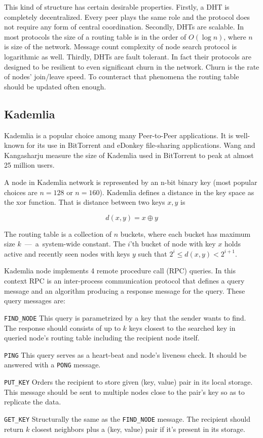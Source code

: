   This kind of structure has certain desirable properties. Firstly, a DHT is
  completely decentralized. Every peer plays the same role and the protocol does
  not require any form of central coordination.
  Secondly, DHTs are scalable.
  In most protocols the size of a routing table is in the order of $O(\log n)$,
  where $n$ is size of the network. Message count complexity of node search
  protocol is logarithmic as well. Thirdly, DHTs are fault tolerant. In fact
  their protocols are designed to be resilient to even significant churn in the
  network. Churn is the rate of nodes' join/leave speed. To counteract that
  phenomena the routing table should be updated often enough.
 
  \subsection{Kademlia}
  Kademlia \cite{may02} is a popular choice among many Peer-to-Peer
  applications. It is well-known for its use in BitTorrent and eDonkey
  file-sharing applications. Wang and Kangasharju \cite{wan13} measure the size
  of Kademlia used in BitTorrent to peak at almost 25 million users.

  A node in Kademlia network is represented by an n-bit binary key (most popular
  choices are $n = 128$ or $n = 160$). Kademlia defines a distance in the
  key space as the xor function. That is distance between two keys $x, y$ is

  \[ d(x, y) = x \oplus y\]

  The routing table is a collection of $n$ buckets, where each bucket has
  maximum size $k$~---~a~\mbox{system-wide} constant. 
  The $i$'th bucket of node with key $x$ holds active and recently seen nodes
  with keys $y$ such that $2^i \leq d(x, y) < 2^{i+1}$.

  Kademlia node implements 4 remote procedure call (RPC) queries. In this
  context RPC is an inter-process communication protocol that defines a query
  message and an algorithm producing a response message for the query. These
  query messages are:

  \begin{description}
    \item{\texttt{FIND\_NODE}} This query is parametrized by a key that the sender
      wants to find. The response should consists of up to $k$ keys closest to
      the searched key in queried node's routing table including the recipient
      node itself.
    \item{\texttt{PING}} This query serves as a heart-beat and node's liveness
      check. It should be answered with a \texttt{PONG} message.
    \item{\texttt{PUT\_KEY}} Orders the recipient to store given (key, value) pair
      in its local storage. This message should be sent to multiple nodes close
      to the pair's key so as to replicate the data.
    \item{\texttt{GET\_KEY}} Structurally the same as the \texttt{FIND\_NODE}
      message. The recipient should return $k$ closest neighbors plus a (key,
      value) pair if it's present in its storage.
  \end{description}

